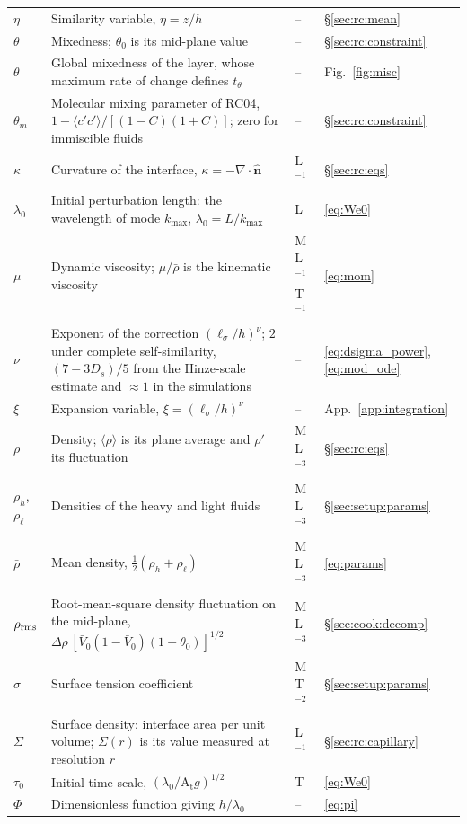 \documentclass[11pt]{article}
\numberwithin{equation}{section}
\newcommand{\avg}[1]{\langle #1\rangle}
\newcommand{\At}{\mathrm{A_t}}
\newcommand{\ls}{\ell_\sigma}
\begin{document}
\begin{longtable}{@{}P{0.13}P{0.53}P{0.13}P{0.13}@{}}
$\eta$ & Similarity variable, $\eta = z/h$ & -- & \S\ref{sec:rc:mean}\\
$\theta$ & Mixedness; $\theta_0$ is its mid-plane value & -- & \S\ref{sec:rc:constraint}\\
$\bar\theta$ & Global mixedness of the layer, whose maximum rate of change defines $t_\theta$ & -- & Fig.~\ref{fig:misc}\\
$\theta_m$ & Molecular mixing parameter of RC04, $1 - \avg{c' c'}/[(1 - C)(1 + C)]$; zero for immiscible fluids & -- & \S\ref{sec:rc:constraint}\\
$\kappa$ & Curvature of the interface, $\kappa = -\nabla \cdot \hat{\mathbf n}$ & L$^{-1}$ & \S\ref{sec:rc:eqs}\\
$\lambda_0$ & Initial perturbation length: the wavelength of mode $k_{\max}$, $\lambda_0 = L/k_{\max}$ & L & \eqref{eq:We0}\\
$\mu$ & Dynamic viscosity; $\mu/\bar\rho$ is the kinematic viscosity & M\,L$^{-1}$T$^{-1}$ & \eqref{eq:mom}\\
$\nu$ & Exponent of the correction $(\ls/h)^{\nu}$; $2$ under complete self-similarity, $(7 - 3 D_s)/5$ from the Hinze-scale estimate and $\approx 1$ in the simulations & -- & \eqref{eq:dsigma_power}, \eqref{eq:mod_ode}\\
$\xi$ & Expansion variable, $\xi = (\ls/h)^{\nu}$ & -- & App.~\ref{app:integration}\\
$\rho$ & Density; $\avg\rho$ is its plane average and $\rho'$ its fluctuation & M\,L$^{-3}$ & \S\ref{sec:rc:eqs}\\
$\rho_h$, $\rho_\ell$ & Densities of the heavy and light fluids & M\,L$^{-3}$ & \S\ref{sec:setup:params}\\
$\bar\rho$ & Mean density, $\tfrac12(\rho_h + \rho_\ell)$ & M\,L$^{-3}$ & \eqref{eq:params}\\
$\rho_{\rm rms}$ & Root-mean-square density fluctuation on the mid-plane, $\Delta \rho \,[\bar V_0(1 - \bar V_0)(1 - \theta_0)]^{1/2}$ & M\,L$^{-3}$ & \S\ref{sec:cook:decomp}\\
$\sigma$ & Surface tension coefficient & M\,T$^{-2}$ & \S\ref{sec:setup:params}\\
$\Sigma$ & Surface density: interface area per unit volume; $\Sigma(r)$ is its value measured at resolution $r$ & L$^{-1}$ & \S\ref{sec:rc:capillary}\\
$\tau_0$ & Initial time scale, $(\lambda_0/\At g)^{1/2}$ & T & \eqref{eq:We0}\\
$\Phi$ & Dimensionless function giving $h/\lambda_0$ & -- & \eqref{eq:pi}\\

\end{longtable}
\end{document}

